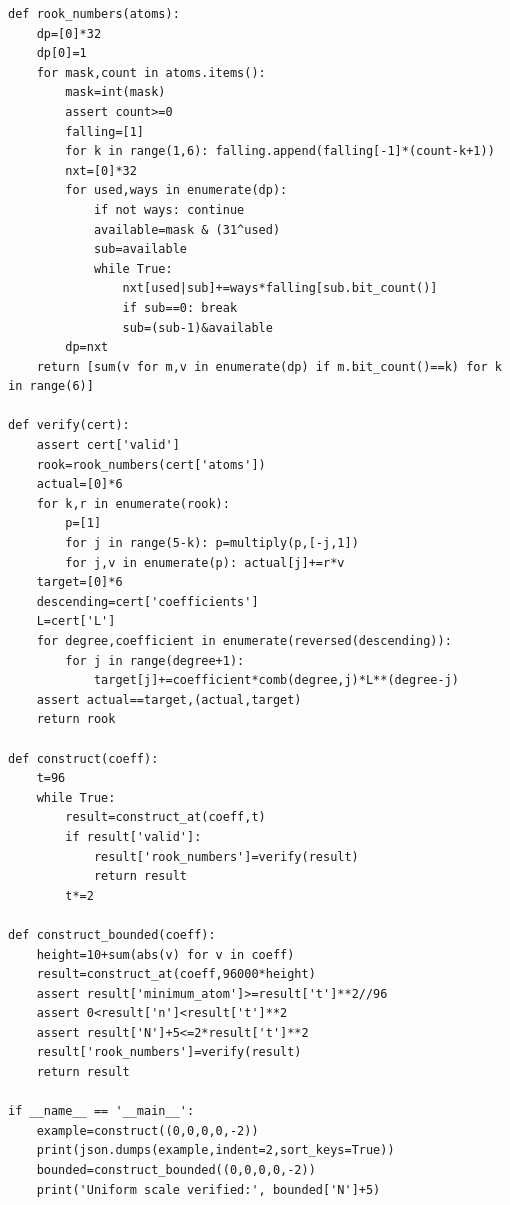 \documentclass[11pt,a4paper]{article}
\theoremstyle{definition}
\begin{document}
\begin{lstlisting}
def rook_numbers(atoms):
    dp=[0]*32
    dp[0]=1
    for mask,count in atoms.items():
        mask=int(mask)
        assert count>=0
        falling=[1]
        for k in range(1,6): falling.append(falling[-1]*(count-k+1))
        nxt=[0]*32
        for used,ways in enumerate(dp):
            if not ways: continue
            available=mask & (31^used)
            sub=available
            while True:
                nxt[used|sub]+=ways*falling[sub.bit_count()]
                if sub==0: break
                sub=(sub-1)&available
        dp=nxt
    return [sum(v for m,v in enumerate(dp) if m.bit_count()==k) for k in range(6)]

def verify(cert):
    assert cert['valid']
    rook=rook_numbers(cert['atoms'])
    actual=[0]*6
    for k,r in enumerate(rook):
        p=[1]
        for j in range(5-k): p=multiply(p,[-j,1])
        for j,v in enumerate(p): actual[j]+=r*v
    target=[0]*6
    descending=cert['coefficients']
    L=cert['L']
    for degree,coefficient in enumerate(reversed(descending)):
        for j in range(degree+1):
            target[j]+=coefficient*comb(degree,j)*L**(degree-j)
    assert actual==target,(actual,target)
    return rook

def construct(coeff):
    t=96
    while True:
        result=construct_at(coeff,t)
        if result['valid']:
            result['rook_numbers']=verify(result)
            return result
        t*=2

def construct_bounded(coeff):
    height=10+sum(abs(v) for v in coeff)
    result=construct_at(coeff,96000*height)
    assert result['minimum_atom']>=result['t']**2//96
    assert 0<result['n']<result['t']**2
    assert result['N']+5<=2*result['t']**2
    result['rook_numbers']=verify(result)
    return result

if __name__ == '__main__':
    example=construct((0,0,0,0,-2))
    print(json.dumps(example,indent=2,sort_keys=True))
    bounded=construct_bounded((0,0,0,0,-2))
    print('Uniform scale verified:', bounded['N']+5)
\end{lstlisting}
\end{document}
